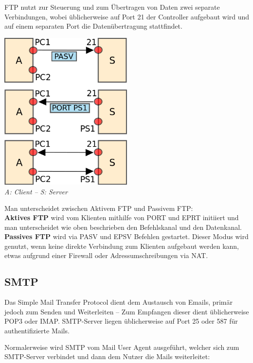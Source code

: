 \documentclass{scrartcl}
\begin{document}
    FTP nutzt zur Steuerung und zum Übertragen von Daten zwei separate Verbindungen, wobei üblicherweise auf Port 21 der Controller aufgebaut wird und auf einem separaten Port die Datenübertragung stattfindet.
    \begin{center}
        \includegraphics[width=0.5\textwidth]{FTPConnectionBuildup.png}\\
        \textit{A: Client -- S: Server\\}
    \end{center}
    
    Man unterscheidet zwischen Aktivem FTP und Passivem FTP:\\
    \textbf{Aktives FTP} wird vom Klienten mithilfe von PORT und EPRT initiiert und man unterscheidet wie oben beschrieben den Befehlskanal und den Datenkanal.\\
\textbf{Passives FTP} wird via PASV und EPSV Befehlen gestartet. Dieser Modus wird genutzt, wenn keine direkte Verbindung zum Klienten aufgebaut werden kann, etwas aufgrund einer Firewall oder Adressumschreibungen via NAT.
    
    \subsection{SMTP}
    Das Simple Mail Transfer Protocol dient dem Austausch von Emails, primär jedoch zum Senden und Weiterleiten -- Zum Empfangen dieser dient üblicherweise POP3 oder IMAP.
    SMTP-Server liegen üblicherweise auf Port 25 oder 587 für authentifizierte Mails.
    
    Normalerweise wird SMTP vom Mail User Agent ausgeführt, welcher sich zum SMTP-Server verbindet und dann dem Nutzer die Mails weiterleitet:
    
\end{document}
